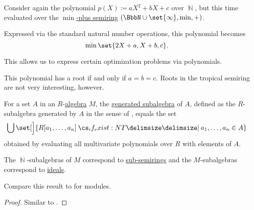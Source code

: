 \begin{example}
\begin{thmenum}
     Consider again the polynomial \( p(X) \coloneqq aX^2 + bX + c \) over \( \BbbN \), but this time evaluated over the \hyperref[def:tropical_semiring]{\( \min \)-plus semiring} \( (\BbbN \cup \set{ \infty }, \min, +) \).

    Expressed via the standard natural number operations, this polynomial becomes
    \begin{equation*}
      \min\set{ 2X + a, X + b, c }.
    \end{equation*}

    This allows us to express certain optimization problems via polynomials.

    This polynomial has a root if and only if \( a = b = c \). Roots in the tropical semiring are not very interesting, however.
  \end{thmenum}
\end{example}

\begin{proposition}\label{thm:generators_via_polynomials}
  For a set \( A \) in an \( R \)-\hyperref[def:algebra_over_semiring]{algebra} \( M \), the \hyperref[def:algebra_over_semiring/submodel]{generated subalgebra} of \( A \), defined as the \( R \)-subalgebra generated by \( A \) in the sense of , equals the set
  \begin{equation*}
    \bigcup \set[\Big]{ R[a_1, \ldots, a_n] \given* a_1, \ldots, a_n \in A }
  \end{equation*}
  obtained by evaluating all multivariate polynomials over \( R \) with elements of \( A \).

  The \( \BbbN \)-subalgebras of \( M \) correspond to \hyperref[def:semiring/submodel]{sub-semirings} and the \( M \)-subalgebras correspond to \hyperref[def:semiring_ideal/generated]{ideals}.

  Compare this result to  for modules.
\end{proposition}
\begin{proof}
  Similar to .
\end{proof}

